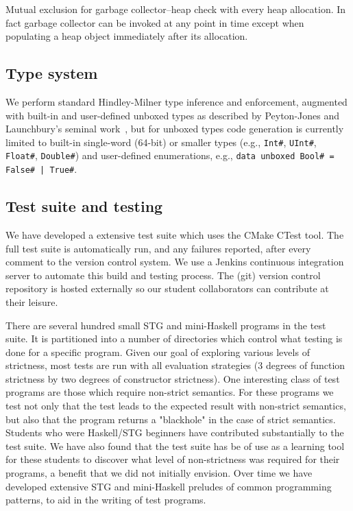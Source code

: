 \documentclass{llncs}
\begin{document}
Mutual exclusion for garbage collector--heap check with every heap allocation.
In fact garbage collector can be invoked at any point in time except when
populating a heap object immediately after its allocation.



\subsection{Type system}

We perform standard Hindley-Milner type inference and enforcement, augmented
with built-in and user-defined unboxed types as described by Peyton-Jones and
Launchbury's seminal work~\cite{unboxed}, but for unboxed types code
generation is currently limited to built-in single-word (64-bit) or smaller
types (e.g., \texttt{Int\#}, \texttt{UInt\#}, \texttt{Float\#}, \texttt{Double\#})
and user-defined enumerations, e.g., \texttt{data unboxed Bool\# = False\# |
  True\#}.

\subsection{Test suite and testing}

We have developed a extensive test suite which uses the CMake \cite{cmake-book}
CTest tool. The full test suite is automatically run, and any failures reported,
after every comment to the version control system. We use a Jenkins continuous
integration server \cite{jenkins-book} to automate this build and testing process.
The (git) version control repository is hosted externally so our student
collaborators can contribute at their leisure.

There are several hundred small STG and mini-Haskell programs in the test suite.
It is partitioned into a number of directories which control what
testing is done for a specific program. Given our goal of exploring various
levels of strictness, most tests are run with all evaluation strategies (3
degrees of function strictness by two degrees of constructor strictness).
One interesting class of test programs are those which require non-strict
semantics. For these programs we test not only that the test leads to the expected
result with non-strict semantics, but also that the program returns a
"blackhole" in the case of strict semantics. Students who were Haskell/STG
beginners have contributed substantially to the test suite. We have also found
that the test suite has be of use as a learning tool for these students to
discover  what level of non-strictness was required for their programs,
a benefit that we did not initially envision. Over time we have developed
extensive STG and mini-Haskell preludes of common programming patterns, to
aid in the writing of test programs.
\end{document}
